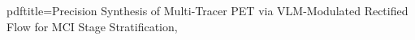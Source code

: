   pdftitle={Precision Synthesis of Multi-Tracer PET via VLM-Modulated Rectified Flow for MCI Stage Stratification},
